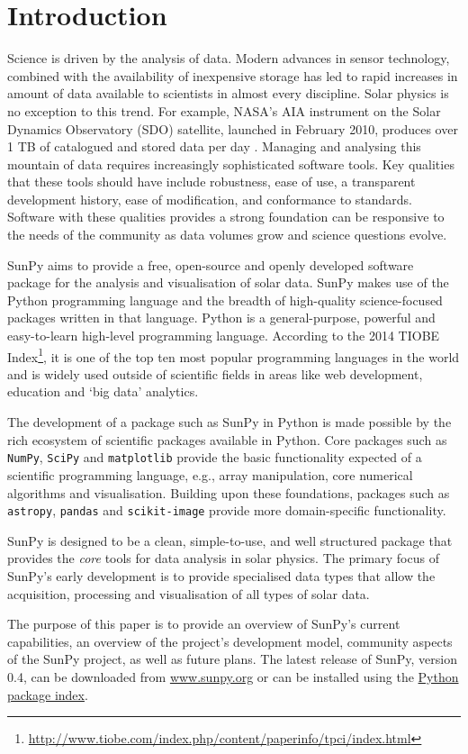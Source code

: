 \section{Introduction}\label{sec:Intro}

Science is driven by the analysis of data. Modern advances in sensor
technology, combined with the availability of inexpensive storage has led to
rapid increases in amount of data available to scientists in almost
every discipline.  Solar physics is no exception to this trend. For example, NASA's
AIA instrument on the Solar Dynamics Observatory (SDO) satellite, launched in February 2010,
produces over 1 TB of catalogued and stored data per day \citep{aia}. Managing and
analysing this mountain of data
requires increasingly sophisticated software tools.  Key qualities
that these tools should have include robustness, ease of use, a
transparent development history, ease of modification, and conformance
to standards.  Software with these qualities provides a strong
foundation can be responsive to the needs of the community as data
volumes grow and science questions evolve.

SunPy aims to provide a free, open-source and openly developed software package 
for the analysis and visualisation of solar data. SunPy makes use of the Python 
programming language and the breadth of high-quality science-focused packages 
written in that language. Python is a general-purpose, 
powerful and easy-to-learn high-level programming language.
According to the 2014 TIOBE Index\footnote{\url{http://www.tiobe.com/index.php/content/paperinfo/tpci/index.html}},
 it is one of the top ten most popular programming languages in the world 
and is widely used outside of scientific fields in areas like web development, education 
and `big data' analytics.


The development of a package such as SunPy in Python is made possible by the 
rich ecosystem of scientific packages available in Python. Core packages such as \texttt{NumPy}, \texttt{SciPy} and \texttt{matplotlib} 
provide the basic functionality expected of a scientific programming language,
e.g., array manipulation, core numerical algorithms and visualisation. 
Building upon these foundations, packages such as \texttt{astropy}, \texttt{pandas} and 
\texttt{scikit-image} provide more domain-specific functionality.

SunPy is designed to be a clean, simple-to-use, and well 
structured package that provides the \textit{core} tools for data analysis in 
solar physics. The primary focus of SunPy's early development is to provide 
specialised data types that allow the acquisition, processing and 
visualisation of all types of solar data.

The purpose of this paper is to provide an overview of SunPy's current 
capabilities, an overview of the project's development model, community aspects of the 
SunPy project, as well as future plans. The latest release of SunPy, version 0.4,
can be downloaded from \href{http://sunpy.org}{www.sunpy.org} or can be
installed using the \href{http://pypi.python.org/pypi}{Python package index}.
